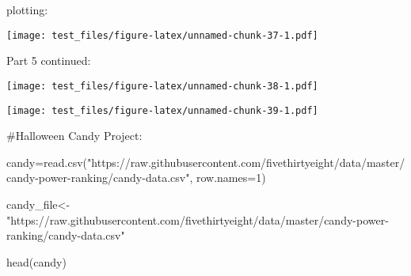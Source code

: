 \documentclass[
]{article}
\newenvironment{Shaded}{\begin{snugshade}}{\end{snugshade}}
\newcommand{\AttributeTok}[1]{\textcolor[rgb]{0.77,0.63,0.00}{#1}}
\newcommand{\DecValTok}[1]{\textcolor[rgb]{0.00,0.00,0.81}{#1}}
\newcommand{\FunctionTok}[1]{\textcolor[rgb]{0.00,0.00,0.00}{#1}}
\newcommand{\NormalTok}[1]{#1}
\newcommand{\OtherTok}[1]{\textcolor[rgb]{0.56,0.35,0.01}{#1}}
\newcommand{\SpecialCharTok}[1]{\textcolor[rgb]{0.00,0.00,0.00}{#1}}
\newcommand{\StringTok}[1]{\textcolor[rgb]{0.31,0.60,0.02}{#1}}
\begin{document}
plotting:

\begin{Shaded}
\end{Shaded}

\texttt{[image: test\_files/figure-latex/unnamed-chunk-37-1.pdf]}

Part 5 continued:

\begin{Shaded}
\end{Shaded}

\texttt{[image: test\_files/figure-latex/unnamed-chunk-38-1.pdf]}

\begin{Shaded}
\end{Shaded}

\texttt{[image: test\_files/figure-latex/unnamed-chunk-39-1.pdf]}

\#Halloween Candy Project:

\begin{Shaded}
\begin{Highlighting}[]
\NormalTok{candy}\OtherTok{=}\FunctionTok{read.csv}\NormalTok{(}\StringTok{"https://raw.githubusercontent.com/fivethirtyeight/data/master/candy{-}power{-}ranking/candy{-}data.csv"}\NormalTok{, }\AttributeTok{row.names=}\DecValTok{1}\NormalTok{)}

\NormalTok{candy\_file}\OtherTok{\textless{}{-}}\StringTok{"https://raw.githubusercontent.com/fivethirtyeight/data/master/candy{-}power{-}ranking/candy{-}data.csv"}

\FunctionTok{head}\NormalTok{(candy)}
\end{Highlighting}
\end{Shaded}
\end{document}
